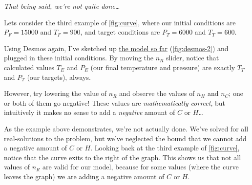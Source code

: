 \documentclass{article}
\begin{document}
\emph{That being said, we're not quite done\ldots}
\begin{example*}
    Lets consider the third example of \cref{fig:curve}, where our initial conditions are
    $P_F=15000$ and $T_F=900$, and target conditions are $P_T=6000$ and $T_T=600$.

    Using Desmos again, I've sketched up
    \href{https://www.desmos.com/calculator/h7vtybqa5r}{the model so far}
    (\cref{fig:desmos-2})
    and plugged in these initial conditions.
    By moving the $n_R$ slider, notice that calculated values $T_E$ and $P_E$ (our final temperature
    and pressure) are exactly $T_T$ and $P_T$ (our targets), always.

    However, try lowering the value of $n_R$ and observe the values of $n_H$ and $n_C$;
    one or both of them go negative! These values are \emph{mathematically correct}, but intuitively
    it makes no sense to add a \emph{negative} amount of $C$ or $H$\ldots
\end{example*}
As the example above demonstrates, we're not actually done. We've solved for all
real-solutions to the problem, but we've neglected the bound that we cannot add a negative amount of
$C$ or $H$. Looking back at the third example of \cref{fig:curve}, notice that the curve exits
to the right of the graph. This shows us that not all values of $n_R$ are valid for our model,
because for some values (where the curve leaves the graph) we are adding a negative amount of $C$ or
$H$.
\end{document}
